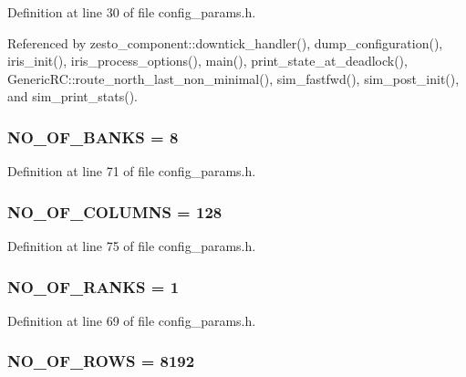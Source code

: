 Definition at line 30 of file config\_\-params.h.

Referenced by zesto\_\-component::downtick\_\-handler(), dump\_\-configuration(), iris\_\-init(), iris\_\-process\_\-options(), main(), print\_\-state\_\-at\_\-deadlock(), GenericRC::route\_\-north\_\-last\_\-non\_\-minimal(), sim\_\-fastfwd(), sim\_\-post\_\-init(), and sim\_\-print\_\-stats().
\subsubsection[{NO\_\-OF\_\-BANKS}]{ {\bf NO\_\-OF\_\-BANKS} = 8}\label{config__params_8h_a9a8bc812122b9b1129824fdea80e872}




Definition at line 71 of file config\_\-params.h.
\subsubsection[{NO\_\-OF\_\-COLUMNS}]{ {\bf NO\_\-OF\_\-COLUMNS} = 128}\label{config__params_8h_ffc6bbc04b2973cf564f70f37103a946}




Definition at line 75 of file config\_\-params.h.
\subsubsection[{NO\_\-OF\_\-RANKS}]{ {\bf NO\_\-OF\_\-RANKS} = 1}\label{config__params_8h_e1acef1609deca0291eaf30593109d17}




Definition at line 69 of file config\_\-params.h.
\subsubsection[{NO\_\-OF\_\-ROWS}]{ {\bf NO\_\-OF\_\-ROWS} = 8192}\label{config__params_8h_b3d6bbcaed3c5e9c84170ea78a55ac79}




